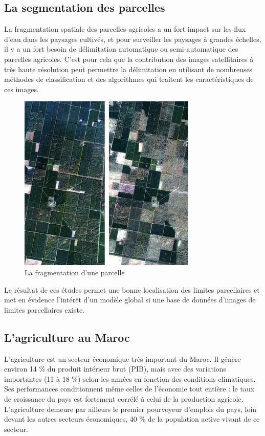 \documentclass[12pt, openany]{report}
\begin{document}
\subsection{La segmentation des parcelles}

La fragmentation spatiale des parcelles agricoles a un fort impact sur les flux d’eau dans les paysages cultivés, et pour surveiller les paysages à grandes échelles, il y a un fort besoin de délimitation automatique ou semi-automatique des parcelles agricoles. C’est pour cela que la contribution des images satellitaires à très haute résolution peut permettre la délimitation en utilisant de nombreuses méthodes de classification et des algorithmes qui traitent les caractéristiques de ces images.\cite{frag}

\begin{figure}[H]
\centering
\includegraphics[scale=0.7]{seg.jpg}
\caption{La fragmentation d'une parcelle}
\end{figure}

Le résultat de ces études permet une bonne localisation des limites parcellaires et met en évidence l’intérêt d’un modèle global si une base de données d’images de limites parcellaires existe. 

\subsection{L'agriculture au Maroc}

L'agriculture est un secteur économique très important du Maroc. Il génère environ 14 \% du produit intérieur brut (PIB), mais avec des variations importantes (11 à 18 \%) selon les années en fonction des conditions climatiques. Ses performances conditionnent même celles de l’économie tout entière : le taux de croissance du pays est fortement corrélé à celui de la production agricole. L’agriculture demeure par ailleurs le premier pourvoyeur d’emplois du pays, loin devant les autres secteurs économiques, 40 \% de la population active vivant de ce secteur.\cite{imagesatt}
\end{document}
